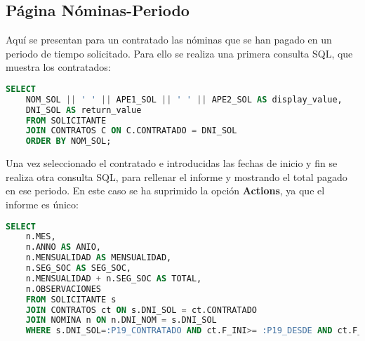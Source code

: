 \subsection{Página Nóminas-Periodo}
Aquí se presentan para un contratado las nóminas que se han pagado en un periodo de tiempo solicitado. Para ello se realiza una primera consulta \acrshort{SQL}, que muestra los contratados:
\begin{lstlisting}[language=SQL, caption={Consulta de contratados para selección}]
	SELECT
	NOM_SOL || ' ' || APE1_SOL || ' ' || APE2_SOL AS display_value,
	DNI_SOL AS return_value
	FROM SOLICITANTE
	JOIN CONTRATOS C ON C.CONTRATADO = DNI_SOL
	ORDER BY NOM_SOL;
\end{lstlisting}
Una vez seleccionado el contratado e introducidas las fechas de inicio y fin se realiza otra consulta \acrshort{SQL}, para rellenar el informe y mostrando el total pagado en ese periodo. En este caso se ha suprimido la opción \textbf{Actions}, ya que el informe es único:
\begin{lstlisting}[language=SQL, caption={Consulta de nóminas para un contratado en un intervalo de tiempo}]
	SELECT 
	n.MES,
	n.ANNO AS ANIO,
	n.MENSUALIDAD AS MENSUALIDAD,
	n.SEG_SOC AS SEG_SOC,
	n.MENSUALIDAD + n.SEG_SOC AS TOTAL,
	n.OBSERVACIONES
	FROM SOLICITANTE s
	JOIN CONTRATOS ct ON s.DNI_SOL = ct.CONTRATADO
	JOIN NOMINA n ON n.DNI_NOM = s.DNI_SOL
	WHERE s.DNI_SOL=:P19_CONTRATADO AND ct.F_INI>= :P19_DESDE AND ct.F_FIN <= :P19_HASTA;
\end{lstlisting}
